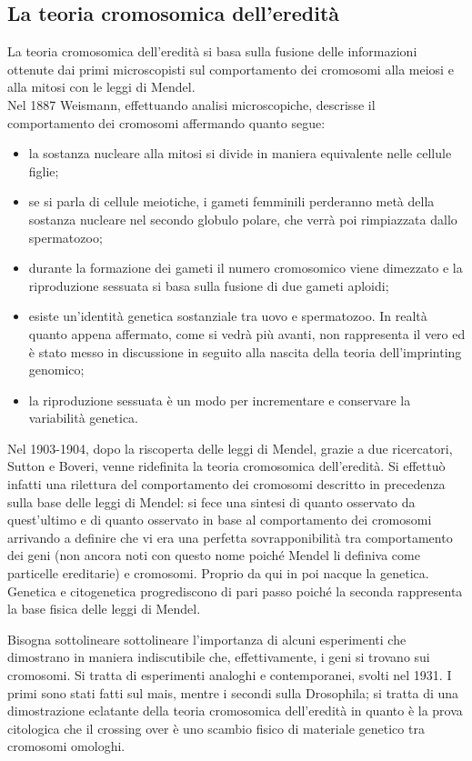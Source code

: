 \documentclass[11pt]{book}
\begin{document}
\subsection{La teoria cromosomica dell’eredità}
La teoria cromosomica dell’eredità si basa sulla fusione delle informazioni ottenute dai primi microscopisti sul comportamento dei cromosomi alla meiosi e alla mitosi con le leggi di Mendel.\\
Nel 1887 Weismann, effettuando analisi microscopiche, descrisse il comportamento dei cromosomi affermando quanto segue:
\begin{itemize}
\item 
la sostanza nucleare alla mitosi si divide in maniera equivalente nelle cellule figlie;
\item
se si parla di cellule meiotiche, i gameti femminili perderanno metà della sostanza nucleare nel secondo globulo polare, che verrà poi rimpiazzata dallo spermatozoo;
\item
durante la formazione dei gameti il numero cromosomico viene dimezzato e la riproduzione sessuata si basa sulla fusione di due gameti aploidi;
\item
esiste un’identità genetica sostanziale tra uovo e spermatozoo. In realtà quanto appena affermato, come si vedrà più avanti, non rappresenta il vero ed è stato messo in discussione in seguito alla nascita della teoria dell’imprinting genomico;
\item
la riproduzione sessuata è un modo per incrementare e conservare la variabilità genetica.
\end{itemize}

Nel 1903-1904, dopo la riscoperta delle leggi di Mendel, grazie a due ricercatori, Sutton e Boveri, venne ridefinita la teoria cromosomica dell’eredità. Si effettuò infatti una rilettura del comportamento dei cromosomi descritto in precedenza sulla base delle leggi di Mendel: si fece una sintesi di quanto osservato da quest’ultimo e di quanto osservato in base al comportamento dei cromosomi arrivando a definire che vi era una perfetta sovrapponibilità tra comportamento dei geni (non ancora noti con questo nome poiché Mendel li definiva come particelle ereditarie) e cromosomi. Proprio da qui in poi nacque la genetica. Genetica e citogenetica progrediscono di pari passo poiché la seconda rappresenta la base fisica delle leggi di Mendel.

Bisogna sottolineare sottolineare l’importanza di alcuni esperimenti che dimostrano in maniera indiscutibile che, effettivamente, i geni si trovano sui cromosomi. Si tratta di esperimenti analoghi e contemporanei, svolti nel 1931. I primi sono stati fatti sul mais, mentre i secondi sulla Drosophila; si tratta di una dimostrazione eclatante della teoria cromosomica dell’eredità in quanto è la prova citologica che il crossing over è uno scambio fisico di materiale genetico tra cromosomi omologhi.
\end{document}
